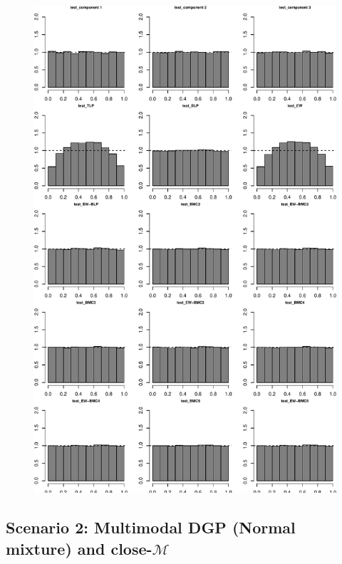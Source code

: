 \documentclass[
]{article}
\begin{document}
\begin{figure}[h]

{\centering \includegraphics{applied_blp_sim_files/figure-latex/unnamed-chunk-7-1} 

}

\end{figure}

\clearpage

\hypertarget{scenario-2-multimodal-dgp-normal-mixture-and-close-mathcalm}{%
\subsection{\texorpdfstring{Scenario 2: Multimodal DGP (Normal mixture)
and
close-\(\mathcal{M}\)}{Scenario 2: Multimodal DGP (Normal mixture) and close-\textbackslash mathcal\{M\}}}\label{scenario-2-multimodal-dgp-normal-mixture-and-close-mathcalm}}
\end{document}
